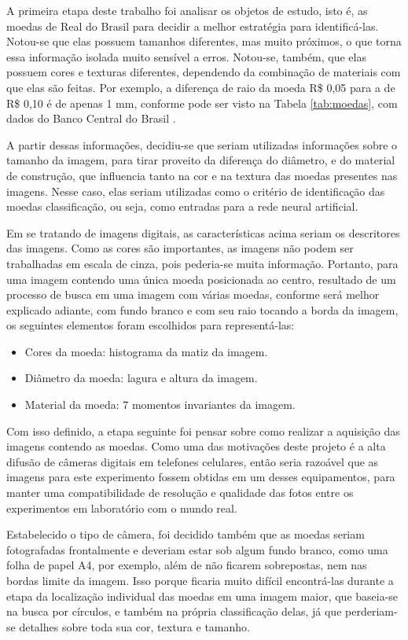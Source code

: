 \documentclass[10pt,journal,compsoc]{IEEEtran}
\begin{document}
A primeira etapa deste trabalho foi analisar os objetos de estudo, isto é, as moedas de Real do Brasil para decidir a melhor estratégia para identificá-las. Notou-se que elas possuem tamanhos diferentes, mas muito próximos, o que torna essa informação isolada muito sensível a erros. Notou-se, também, que elas possuem cores e texturas diferentes, dependendo da combinação de materiais com que elas são feitas. Por exemplo, a diferença  de raio da moeda R\$ 0,05 para a de R\$ 0,10 é de apenas 1 mm, conforme pode ser visto na Tabela \ref{tab:moedas}, com dados do Banco Central do Brasil \cite{bcb}.

A partir dessas informações, decidiu-se que seriam utilizadas informações sobre o tamanho da imagem, para tirar proveito da diferença do diâmetro, e do material de construção, que influencia tanto na cor e na textura das moedas presentes nas imagens. Nesse caso, elas seriam utilizadas como o critério de identificação das moedas classificação, ou seja, como entradas para a rede neural artificial. 

Em se tratando de imagens digitais, as características acima seriam os descritores das imagens. Como as cores são importantes, as imagens não podem ser trabalhadas em escala de cinza, pois pederia-se muita informação. Portanto, para uma imagem contendo uma única moeda posicionada ao centro, resultado de um processo de busca em uma imagem com várias moedas, conforme será melhor explicado adiante, com fundo branco e com seu raio tocando a borda da imagem, os seguintes elementos foram escolhidos para representá-las:

\begin{itemize}  
\item Cores da moeda: histograma da matiz da imagem. 
\item Diâmetro da moeda: lagura e altura da imagem.
\item Material da moeda: 7 momentos invariantes da imagem.
\end{itemize}

Com isso definido, a etapa seguinte foi pensar sobre como realizar a aquisição das imagens contendo as moedas. Como uma das motivações deste projeto é a alta difusão de câmeras digitais em telefones celulares, então seria razoável que as imagens para este experimento fossem obtidas em um desses equipamentos, para manter uma compatibilidade de resolução e qualidade das fotos entre os experimentos em laboratório com o mundo real. 

Estabelecido o tipo de câmera, foi decidido também que as moedas seriam fotografadas frontalmente e deveriam estar sob algum fundo branco, como uma folha de papel A4, por exemplo, além de não ficarem sobrepostas, nem nas bordas limite da imagem. Isso porque ficaria muito difícil encontrá-las durante a etapa da localização individual das moedas em uma imagem maior, que baseia-se na busca por círculos, e também na própria classificação delas, já que perderiam-se detalhes sobre toda sua cor, textura e tamanho. 
\end{document}
